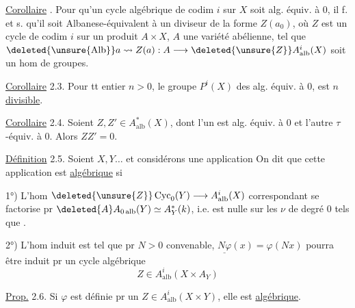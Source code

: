 \uline{Corollaire} . Pour qu'un cycle algébrique de codim \(i\) sur \(X\) soit alg. équiv. à 0, il f. et s. qu'il soit Albanese-équivalent à un diviseur de la forme \(Z(a_0)\), où  \(Z\) est un cycle de codim \(i\) sur un  produit \(A\times X\), \(A\) une variété abélienne, tel que \(\deleted{\unsure{\operatorname{Alb}}}a\leadsto Z(a):A\longrightarrow\deleted{\unsure{Z}}A^i_{\mathrm{alb}}(X)\) soit un hom de groupes.

\uline{Corollaire} 2.3. Pour tt entier \(n>0\), le groupe \(P^i(X)\) des  alg. équiv. à 0, est \(n\) \uline{divisible}.

\uline{Corollaire} 2.4. Soient \(Z,Z'\in A^*_{\mathrm{alb}}(X)\), dont l'un est alg. équiv. à 0 et l'autre \(\tau\)-équiv. à 0. Alors \(ZZ'=0\).


\uline{Définition} 2.5. Soient \(X,Y\ldots\) et considérons une application
On dit que cette application est \uline{algébrique} si

1°) L'hom \(\deleted{\unsure{Z}}\operatorname{Cyc}_0(Y)\longrightarrow A^i_{\mathrm{alb}}(X)\) correspondant se factorise pr \(\deleted{A}A_{0\,\mathrm{alb}}(Y)\simeq A_Y^*(k)\), i.e.  est nulle sur les \(\nu\) de degré 0 tels que .

2°) L'hom induit
est tel que pr \(N>0\) convenable, \(\underline{N\varphi}(x)=\varphi(Nx)\) pourra être induit pr un cycle algébrique
\[
Z\in A^i_{\mathrm{alb}}(X\times A_Y)
\]

\uline{Prop.} 2.6. Si \(\varphi\) est définie pr un \(Z\in A^i_{\mathrm{alb}}(X\times Y)\), elle est \uline{algébrique}.

